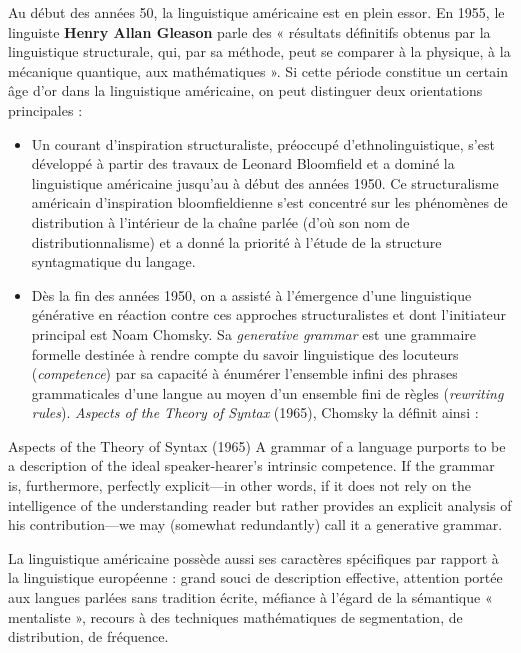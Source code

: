 \begin{keybox}[Introduction]
Au début des années 50, la linguistique américaine est en plein essor. En 1955, le linguiste \textbf{Henry Allan Gleason} parle des « résultats définitifs obtenus par la linguistique structurale, qui, par sa méthode, peut se comparer à la physique, à la mécanique quantique, aux mathématiques ». Si cette période constitue un certain âge d’or dans la linguistique américaine, on peut distinguer deux orientations principales :

\begin{itemize}[leftmargin=1.5em]
\item Un courant d’inspiration structuraliste, préoccupé d’ethnolinguistique, s’est développé à partir des travaux de Leonard Bloomfield et a dominé la linguistique américaine jusqu’au à début des années 1950. Ce structuralisme américain d’inspiration bloomfieldienne s’est concentré sur les phénomènes de distribution à l’intérieur de la chaîne parlée (d’où son nom de distributionnalisme) et a donné la priorité à l’étude de la structure syntagmatique du langage.
\item Dès la fin des années 1950, on a assisté à l’émergence d’une linguistique générative en réaction contre ces approches structuralistes et dont l’initiateur principal est Noam Chomsky. Sa \textit{generative grammar} est une grammaire formelle destinée à rendre compte du savoir linguistique des locuteurs (\textit{competence}) par sa capacité à énumérer l’ensemble infini des phrases grammaticales d’une langue au moyen d’un ensemble fini de règles (\textit{rewriting rules}). \textit{Aspects of the Theory of Syntax} (1965), Chomsky la définit ainsi :
\end{itemize}
\begin{lecture}{Aspects of the Theory of Syntax (1965)}
A grammar of a language purports to be a description of the ideal speaker-hearer’s intrinsic competence. If the grammar is, furthermore, perfectly explicit—in other words, if it does not rely on the intelligence of the understanding reader but rather provides an explicit analysis of his contribution—we may (somewhat redundantly) call it a generative grammar.
\end{lecture}
La linguistique américaine possède aussi ses caractères spécifiques par rapport à la linguistique européenne : grand souci de description effective, attention portée aux langues parlées sans tradition écrite, méfiance à l’égard de la sémantique « mentaliste », recours à des techniques mathématiques de segmentation, de distribution, de fréquence.
\end{keybox}

